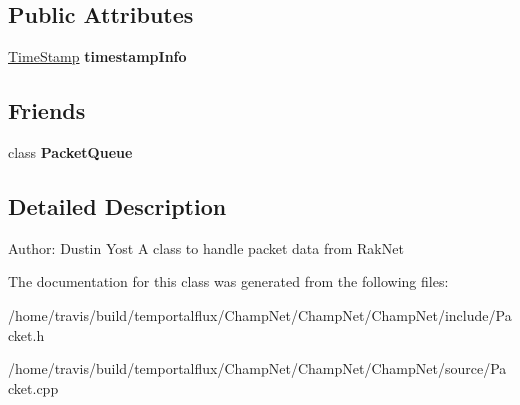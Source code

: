 \subsection*{Public Attributes}
\begin{DoxyCompactItemize}
\item 
\hypertarget{class_champ_net_1_1_packet_a0fcefd5ba56854e5a8e3e63a51e3963e}{\hyperlink{struct_champ_net_1_1_time_stamp}{Time\-Stamp} {\bfseries timestamp\-Info}}\label{class_champ_net_1_1_packet_a0fcefd5ba56854e5a8e3e63a51e3963e}

\end{DoxyCompactItemize}
\subsection*{Friends}
\begin{DoxyCompactItemize}
\item 
\hypertarget{class_champ_net_1_1_packet_ac3f1afb9cc164b535c73e6f5909519ff}{class {\bfseries Packet\-Queue}}\label{class_champ_net_1_1_packet_ac3f1afb9cc164b535c73e6f5909519ff}

\end{DoxyCompactItemize}


\subsection{Detailed Description}
Author\-: Dustin Yost A class to handle packet data from Rak\-Net 

The documentation for this class was generated from the following files\-:\begin{DoxyCompactItemize}
\item 
/home/travis/build/temportalflux/\-Champ\-Net/\-Champ\-Net/\-Champ\-Net/include/Packet.\-h\item 
/home/travis/build/temportalflux/\-Champ\-Net/\-Champ\-Net/\-Champ\-Net/source/Packet.\-cpp\end{DoxyCompactItemize}
